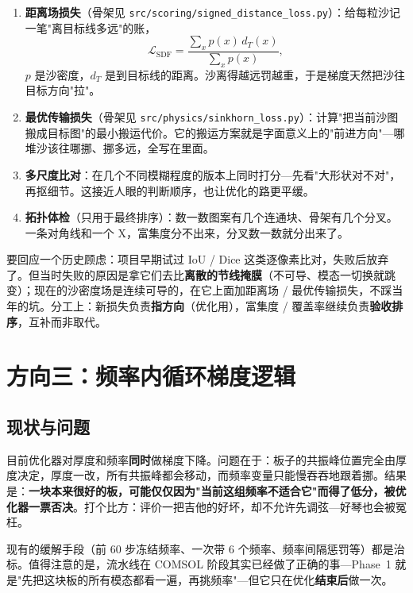 \documentclass[11pt,a4paper]{article}
\newcommand{\code}[1]{\texttt{#1}}
\begin{document}
\begin{enumerate}[leftmargin=2em]
\item \textbf{距离场损失}（骨架见 \code{src/scoring/signed\_distance\_loss.py}）：给每粒沙记一笔"离目标线多远"的账，
\begin{equation}
\mathcal{L}_{\mathrm{SDF}} = \frac{\sum_{x} p(x)\, d_T(x)}{\sum_x p(x)},
\end{equation}
$p$ 是沙密度，$d_T$ 是到目标线的距离。沙离得越远罚越重，于是梯度天然把沙往目标方向"拉"。
\item \textbf{最优传输损失}（骨架见 \code{src/physics/sinkhorn\_loss.py}）：计算"把当前沙图搬成目标图"的最小搬运代价。它的搬运方案就是字面意义上的"前进方向"---哪堆沙该往哪挪、挪多远，全写在里面。
\item \textbf{多尺度比对}：在几个不同模糊程度的版本上同时打分---先看"大形状对不对"，再抠细节。这接近人眼的判断顺序，也让优化的路更平缓。
\item \textbf{拓扑体检}（只用于最终排序）：数一数图案有几个连通块、骨架有几个分叉。一条对角线和一个 X，富集度分不出来，分叉数一数就分出来了。
\end{enumerate}

要回应一个历史顾虑：项目早期试过 IoU / Dice 这类逐像素比对，失败后放弃了。但当时失败的原因是拿它们去比\textbf{离散的节线掩膜}（不可导、模态一切换就跳变）；现在的沙密度场是连续可导的，在它上面加距离场 / 最优传输损失，不踩当年的坑。分工上：新损失负责\textbf{指方向}（优化用），富集度 / 覆盖率继续负责\textbf{验收排序}，互补而非取代。

\section{方向三：频率内循环梯度逻辑}

\subsection{现状与问题}

目前优化器对厚度和频率\textbf{同时}做梯度下降。问题在于：板子的共振峰位置完全由厚度决定，厚度一改，所有共振峰都会移动，而频率变量只能慢吞吞地跟着挪。结果是：\textbf{一块本来很好的板，可能仅仅因为"当前这组频率不适合它"而得了低分，被优化器一票否决}。打个比方：评价一把吉他的好坏，却不允许先调弦---好琴也会被冤枉。

现有的缓解手段（前 60 步冻结频率、一次带 6 个频率、频率间隔惩罚等）都是治标。值得注意的是，流水线在 COMSOL 阶段其实已经做了正确的事---Phase~1 就是"先把这块板的所有模态都看一遍，再挑频率"---但它只在优化\textbf{结束后}做一次。
\end{document}
